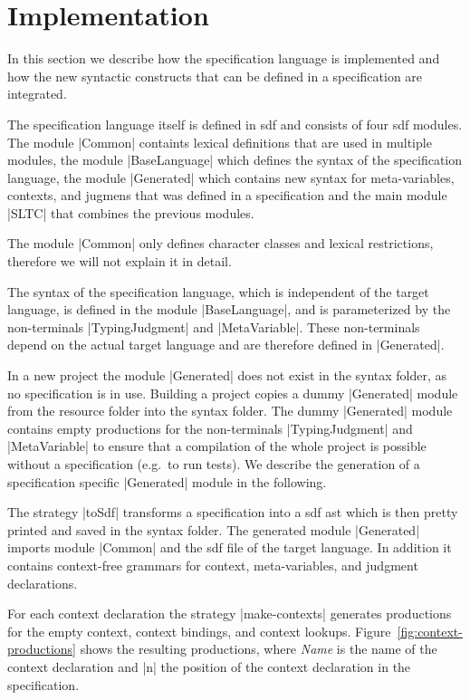 \section{Implementation}
\label{sec:generate-sdf}
In this section we describe how the specification language is
implemented and how the new syntactic constructs that can be defined
in a specification are integrated.

The specification language itself is defined in \gls{sdf} and consists
of four \gls{sdf} modules. The module \code|Common| containts lexical
definitions that are used in multiple modules, the module
\code|BaseLanguage| which defines the syntax of the specification
language, the module \code|Generated| which contains new syntax for
meta-variables, contexts, and jugmens that was defined in a
specification and the main module \code|SLTC| that combines the
previous modules.

The module \code|Common| only defines character classes and lexical
restrictions, therefore we will not explain it in detail.

The syntax of the specification language, which is independent of the
target language, is defined in the module \code|BaseLanguage|, and
is parameterized by the non-terminals \code|TypingJudgment| and
\code|MetaVariable|. These non-terminals depend on the actual target
language and are therefore defined in \code|Generated|.

In a new project the module \code|Generated| does not exist in the
syntax folder, as no specification is in use. Building a project
copies a dummy \code|Generated| module from the resource folder into
the syntax folder. The dummy \code|Generated| module contains empty
productions for the non-terminals \code|TypingJudgment| and
\code|MetaVariable| to ensure that a compilation of the whole project
is possible without a specification (e.g.\ to run tests). We describe
the generation of a specification specific \code|Generated| module in
the following.

The strategy \code|toSdf| transforms a specification into a \gls{sdf}
\gls{ast} which is then pretty printed and saved in the syntax
folder. The generated module \code|Generated| imports module
\code|Common| and the \gls{sdf} file of the target language. In
addition it contains context-free grammars for context,
meta-variables, and judgment declarations.

For each context declaration the strategy \code|make-contexts|
generates productions for the empty context, context bindings, and
context lookups. Figure~\ref{fig:context-productions} shows the
resulting productions, where \textit{Name} is the name of the context
declaration and \code|n| the position of the context declaration in
the specification.

